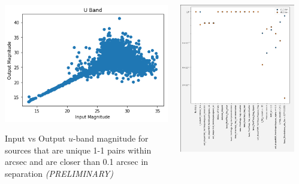 \documentclass[aspectratio=169]{beamer}
\begin{document}
\begin{frame}
\begin{columns}
\begin{column}{8cm}
\begin{itemize}
      \end{itemize}
    \end{column}
    \begin{column}{3.5cm}
      \includegraphics[width=\linewidth]{./image.png}
      \begin{center}
\scriptsize
        Input vs Output $u$-band magnitude for sources that are unique
        1-1 pairs within arcsec and are closer than 0.1 arcsec in separation
        \textit{(PRELIMINARY)}
      \end{center}
    \end{column}
    \begin{column}{3.5cm}
      \includegraphics[width=\linewidth]{./dcmat2.png}

\end{column}
\end{columns}
\end{frame}
\end{document}
